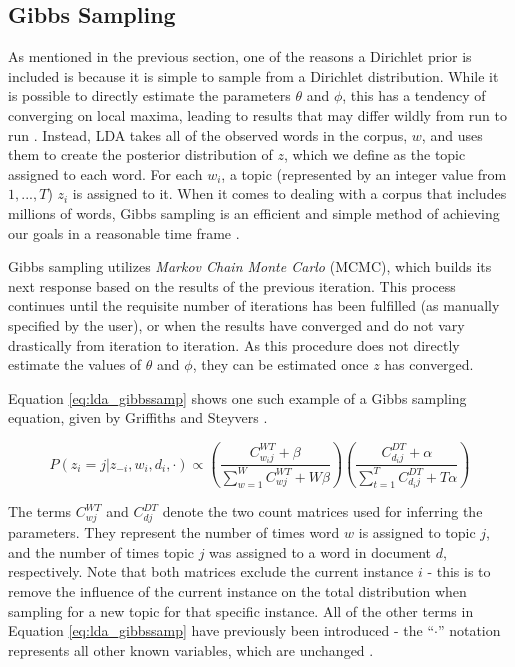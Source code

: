 \documentclass[a4paper]{article}
\begin{document}
\subsection{Gibbs Sampling}
As mentioned in the previous section, one of the reasons a Dirichlet prior is included is because it is simple to sample from a Dirichlet distribution. While it is possible to directly estimate the parameters $\theta$ and $\phi$, this has a tendency of converging on local maxima, leading to results that may differ wildly from run to run \cite{hoffman}. Instead, LDA takes all of the observed words in the corpus, $w$, and uses them to create the posterior distribution of $z$, which we define as the topic assigned to each word. For each $w_i$, a topic (represented by an integer value from $1, ..., T$) $z_i$ is assigned to it. When it comes to dealing with a corpus that includes millions of words, Gibbs sampling is an efficient and simple method of achieving our goals in a reasonable time frame \cite{lda}.

Gibbs sampling utilizes \textit{Markov Chain Monte Carlo} (MCMC), which builds its next response based on the results of the previous iteration. This process continues until the requisite number of iterations has been fulfilled (as manually specified by the user), or when the results have converged and do not vary drastically from iteration to iteration. As this procedure does not directly estimate the values of $\theta$ and $\phi$, they can be estimated once $z$ has converged.

Equation \ref{eq:lda_gibbssamp} shows one such example of a Gibbs sampling equation, given by Griffiths and Steyvers \cite{griff}.

\begin{equation}\label{eq:lda_gibbssamp}
  P(z_i = j | z_{-i}, w_i, d_i, \cdot) \propto
    (\frac{C_{w_ij}^{WT} + \beta}
    {\sum\limits^W_{w = 1} C_{wj}^{WT} + W\beta})
    (\frac{C_{d_ij}^{DT} + \alpha}
    {\sum\limits^T_{t = 1} C_{d_ij}^{DT} + T\alpha})
\end{equation}

The terms $C_{wj}^{WT}$ and $C_{dj}^{DT}$ denote the two count matrices used for inferring the parameters. They represent the number of times word $w$ is assigned to topic $j$, and the number of times topic $j$ was assigned to a word in document $d$, respectively. Note that both matrices exclude the current instance $i$ - this is to remove the influence of the current instance on the total distribution when sampling for a new topic for that specific instance. All of the other terms in Equation \ref{eq:lda_gibbssamp} have previously been introduced - the ``$\cdot$'' notation represents all other known variables, which are unchanged \cite{lda}.
\end{document}
